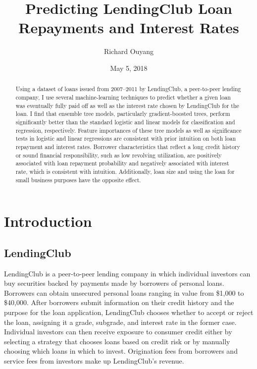 \documentclass[12pt]{article}
\title{Predicting LendingClub Loan Repayments and Interest Rates}
\author{Richard Ouyang}
\date{May 5, 2018}
\begin{document}
\maketitle

\begin{abstract}
Using a dataset of loans issued from 2007--2011 by LendingClub, a peer-to-peer lending company, I use several machine-learning techniques to predict whether a given loan was eventually fully paid off as well as the interest rate chosen by LendingClub for the loan. I find that ensemble tree models, particularly gradient-boosted trees, perform significantly better than the standard logistic and linear models for classification and regression, respectively. Feature importances of these tree models as well as significance tests in logistic and linear regressions are consistent with prior intuition on both loan repayment and interest rates. Borrower characteristics that reflect a long credit history or sound financial responsibility, such as low revolving utilization, are positively associated with loan repayment probability and negatively associated with interest rate, which is consistent with intuition. Additionally, loan size and using the loan for small business purposes have the opposite effect.
\end{abstract}

\newpage
\tableofcontents

\newpage
\section{Introduction}

\subsection{LendingClub}

LendingClub \cite{lendingclub} is a peer-to-peer lending company in which individual investors can buy securities backed by payments made by borrowers of personal loans. Borrowers can obtain unsecured personal loans ranging in value from \$1,000 to \$40,000. After borrowers submit information on their credit history and the purpose for the loan application, LendingClub chooses whether to accept or reject the loan, assigning it a grade, subgrade, and interest rate in the former case. Individual investors can then receive exposure to consumer credit either by selecting a strategy that chooses loans based on credit risk or by manually choosing which loans in which to invest. Origination fees from borrowers and service fees from investors make up LendingClub's revenue.
\end{document}
